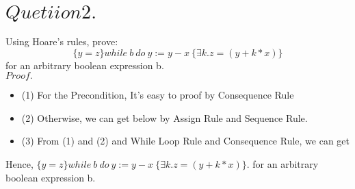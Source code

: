 \documentclass[a4paper,11pt,fleqn]{article}
\theoremstyle{mytheor}
\begin{document}
\section*{$Quetiion 2.$}
Using Hoare’s rules, prove:
$$\{y=z\}while\ b\ do\ y:=y-x\ \{\exists k.z=(y+k*x) \}$$
for an arbitrary boolean expression b.\\
$Proof.$ 
\begin{itemize}
\item(1) For the Precondition, It's easy to proof by Consequence Rule\\
\begin{prooftree}
\end{prooftree}
\item(2) Otherwise, we can get below by Assign Rule and Sequence Rule.\\
\begin{changemargin}{-1cm}{0cm}
\begin{prooftree}
\end{prooftree}
\begin{prooftree}
\end{prooftree}
\end{changemargin}
\item(3) From (1) and (2) and While Loop Rule and Consequence Rule, we can get\\
\begin{prooftree}
\end{prooftree}
\end{itemize}
Hence, $\{y=z\}while\ b\ do\ y:=y-x\ \{\exists k.z=(y+k*x) \}$. for an arbitrary boolean expression b.\\
\end{document}
